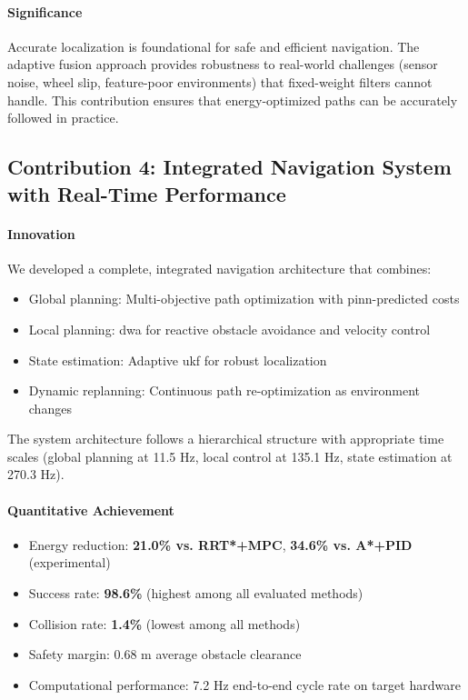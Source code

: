 \paragraph{Significance}
Accurate localization is foundational for safe and efficient navigation. The adaptive fusion approach provides robustness to real-world challenges (sensor noise, wheel slip, feature-poor environments) that fixed-weight filters cannot handle. This contribution ensures that energy-optimized paths can be accurately followed in practice.

\subsection{Contribution 4: Integrated Navigation System with Real-Time Performance}

\paragraph{Innovation}
We developed a complete, integrated navigation architecture that combines:
\begin{itemize}
    \item Global planning: Multi-objective path optimization with \acrshort{pinn}-predicted costs
    \item Local planning: \acrshort{dwa} for reactive obstacle avoidance and velocity control
    \item State estimation: Adaptive \acrshort{ukf} for robust localization
    \item Dynamic replanning: Continuous path re-optimization as environment changes
\end{itemize}

The system architecture follows a hierarchical structure with appropriate time scales (global planning at 11.5 Hz, local control at 135.1 Hz, state estimation at 270.3 Hz).

\paragraph{Quantitative Achievement}
\begin{itemize}
    \item Energy reduction: \textbf{21.0\% vs. RRT*+MPC}, \textbf{34.6\% vs. A*+PID} (experimental)
    \item Success rate: \textbf{98.6\%} (highest among all evaluated methods)
    \item Collision rate: \textbf{1.4\%} (lowest among all methods)
    \item Safety margin: 0.68 m average obstacle clearance
    \item Computational performance: 7.2 Hz end-to-end cycle rate on target hardware
\end{itemize}

